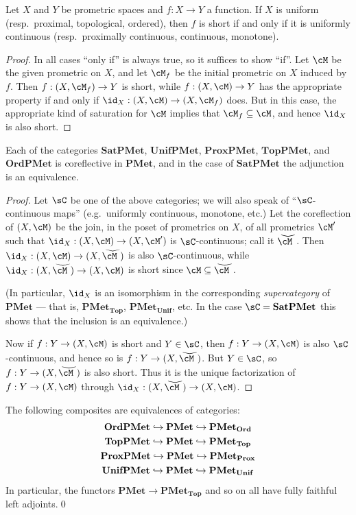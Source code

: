 \documentclass{article}
\def\sat#1{\widecheck{#1}}
\def\PMet{\mathbf{PMet}}
\def\PMetTop{\mathbf{PMet}_{\mathbf{Top}}}
\def\PMetUnif{\mathbf{PMet}_{\mathbf{Unif}}}
\def\PMetProx{\mathbf{PMet}_{\mathbf{Prox}}}
\def\PMetOrd{\mathbf{PMet}_{\mathbf{Ord}}}
\def\TopPMet{\mathbf{TopPMet}}
\def\UnifPMet{\mathbf{UnifPMet}}
\def\ProxPMet{\mathbf{ProxPMet}}
\def\OrdPMet{\mathbf{OrdPMet}}
\def\SatPMet{\mathbf{SatPMet}}
\begin{document}
\begin{thm}\label{thm:sat-maps}
  Let $X$ and $Y$ be prometric spaces and $f:X\to Y$ a function.
  If $X$ is uniform (resp.\ proximal, topological, ordered), then $f$ is short if and only if it is uniformly continuous (resp.\ proximally continuous, continuous, monotone).
\end{thm}
\begin{proof}
  In all cases ``only if'' is always true, so it suffices to show ``if''.
  Let $\cM$ be the given prometric on $X$, and let $\cM_f$ be the initial prometric on $X$ induced by $f$.
  Then $f:(X,\cM_f) \to Y$ is short, while $f:(X,\cM) \to Y$ has the appropriate property if and only if $\id_X:(X,\cM) \to (X,\cM_f)$ does.
  But in this case, the appropriate kind of saturation for $\cM$ implies that $\cM_f \subseteq \cM$, and hence $\id_X$ is also short.
\end{proof}

\begin{thm}\label{thm:pmet-coref}
  Each of the categories $\SatPMet$, $\UnifPMet$, $\ProxPMet$, $\TopPMet$, and $\OrdPMet$ is coreflective in $\PMet$, and in the case of $\SatPMet$ the adjunction is an equivalence.
\end{thm}
\begin{proof}
  Let $\sC$ be one of the above categories; we will also speak of ``$\sC$-continuous maps'' (e.g.\ uniformly continuous, monotone, etc.)
  Let the coreflection of $(X,\cM)$ be the join, in the poset of prometrics on $X$, of all prometrics $\cM'$ such that $\id_X :(X,\cM) \to (X,\cM')$ is $\sC$-continuous; call it $\sat{\cM}$.
  Then $\id_X :(X,\cM) \to (X,\sat{\cM})$ is also $\sC$-continuous, while $\id_X : (X,\sat{\cM}) \to (X,\cM)$ is short since $\cM \subseteq \sat{\cM}$.

  (In particular, $\id_X$ is an isomorphism in the corresponding \emph{supercategory} of $\PMet$ --- that is, $\PMetTop$, $\PMetUnif$, etc.
  In the case $\sC=\SatPMet$ this shows that the inclusion is an equivalence.)

  Now if $f:Y\to (X,\cM)$ is short and $Y\in\sC$, then $f:Y\to (X,\cM)$ is also $\sC$-continuous, and hence so is $f:Y\to (X,\sat{\cM})$.
  But $Y\in\sC$, so $f:Y\to (X,\sat{\cM})$ is also short.
  Thus it is the unique factorization of $f:Y\to (X,\cM)$ through $\id_X : (X,\sat{\cM}) \to (X,\cM)$.
\end{proof}

\begin{cor}\label{thm:pmet-coref-equiv}
  The following composites are equivalences of categories:
  \begin{gather*}
    \OrdPMet \into \PMet \into \PMetOrd\\
    \TopPMet \into \PMet \into \PMetTop\\
    \ProxPMet \into \PMet \into \PMetProx\\
    \UnifPMet \into \PMet \into \PMetUnif
  \end{gather*}
  In particular, the functors $\PMet \to \PMetTop$ and so on all have fully faithful left adjoints.\qed
\end{cor}
\end{document}
